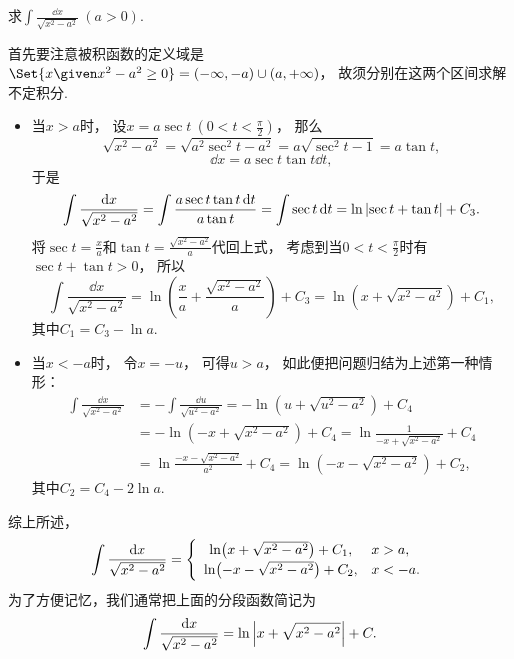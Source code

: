\begin{example}
求\(\int \frac{\dd{x}}{\sqrt{x^2 - a^2}}\ (a>0)\).
\begin{solution}
首先要注意被积函数的定义域是\(\Set{ x \given x^2-a^2\geq0 }=(-\infty,-a)\cup(a,+\infty)\)，
故须分别在这两个区间求解不定积分.

\begin{itemize}
	\item 当\(x > a\)时，
	设\(x = a \sec t\ (0 < t < \frac\pi2)\)，
	那么\begin{equation*}
		\sqrt{x^2 - a^2} = \sqrt{a^2 \sec^2 t - a^2} = a \sqrt{\sec^2 t - 1} = a \tan t,
	\end{equation*}\begin{equation*}
		\dd{x} = a \sec t \tan t \dd{t},
	\end{equation*}
	于是\begin{equation*}
		\int \frac{\dd{x}}{\sqrt{x^2 - a^2}}
		= \int \frac{a \sec t \tan t \dd{t}}{a \tan t}
		= \int \sec t \dd{t}
		= \ln\abs{\sec t + \tan t} + C_3.
	\end{equation*}
	将\(\sec t = \frac{x}{a}\)和\(\tan t = \frac{\sqrt{x^2-a^2}}{a}\)代回上式，
	考虑到当\(0<t<\frac\pi2\)时有\(\sec t + \tan t > 0\)，
	所以\begin{equation*}
		\int \frac{\dd{x}}{\sqrt{x^2 - a^2}}
		= \ln( \frac{x}{a} + \frac{\sqrt{x^2 - a^2}}{a} ) + C_3
		= \ln( x + \sqrt{x^2 - a^2} ) + C_1,
	\end{equation*}
	其中\(C_1 = C_3 - \ln a\).

	\item 当\(x < -a\)时，
	令\(x = -u\)，
	可得\(u > a\)，
	如此便把问题归结为上述第一种情形：\begin{align*}
		\int \frac{\dd{x}}{\sqrt{x^2 - a^2}}
		&= -\int \frac{\dd{u}}{\sqrt{u^2 - a^2}}
		= -\ln(u + \sqrt{u^2 - a^2}) + C_4 \\
		&= -\ln(-x + \sqrt{x^2 - a^2}) + C_4
		= \ln\frac1{-x + \sqrt{x^2 - a^2}} + C_4 \\
		&= \ln\frac{-x - \sqrt{x^2 - a^2}}{a^2} + C_4
		= \ln(-x - \sqrt{x^2 - a^2}) + C_2,
	\end{align*}
	其中\(C_2 = C_4 - 2 \ln a\).
\end{itemize}
综上所述，\begin{equation}
	\int \frac{\dd{x}}{\sqrt{x^2 - a^2}}
	= \left\{ \def\arraystretch{1.2} \begin{array}{cl}
		\ln(x+\sqrt{x^2-a^2}) + C_1, & x>a, \\
		\ln(-x-\sqrt{x^2-a^2}) + C_2, & x<-a.
	\end{array} \right.
\end{equation}
为了方便记忆，我们通常把上面的分段函数简记为\begin{equation}
	\int \frac{\dd{x}}{\sqrt{x^2 - a^2}}
	= \ln\abs{x + \sqrt{x^2 - a^2}} + C.
\end{equation}
\end{solution}
\end{example}

